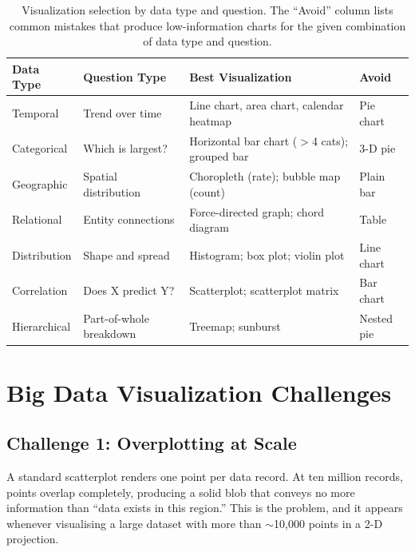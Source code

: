 \begin{table}[htbp]
\centering
\renewcommand{\arraystretch}{1.4}
\begin{tabular}{lp{3.2cm}p{4.5cm}p{2.0cm}}
  \toprule
  \textbf{Data Type} & \textbf{Question Type}
    & \textbf{Best Visualization} & \textbf{Avoid} \\
  \midrule
  Temporal    & Trend over time  & Line chart, area chart, calendar heatmap & Pie chart \\
  Categorical & Which is largest? & Horizontal bar chart ($>$4 cats); grouped bar & 3-D pie \\
  Geographic  & Spatial distribution & Choropleth (rate); bubble map (count) & Plain bar \\
  Relational  & Entity connections & Force-directed graph; chord diagram & Table \\
  Distribution & Shape and spread & Histogram; box plot; violin plot & Line chart \\
  Correlation & Does X predict Y? & Scatterplot; scatterplot matrix & Bar chart \\
  Hierarchical & Part-of-whole breakdown & Treemap; sunburst & Nested pie \\
  \bottomrule
\end{tabular}
\caption{Visualization selection by data type and question. The ``Avoid''
         column lists common mistakes that produce low-information charts
         for the given combination of data type and question.}
\label{tab:chart-selection}
\end{table}

\section{Big Data Visualization Challenges}
\label{sec:bigdata-viz-challenges}

\subsection{Challenge 1: Overplotting at Scale}
\label{subsec:overplotting}

A standard scatterplot renders one point per data record. At ten million
records, points overlap completely, producing a solid blob that conveys
no more information than ``data exists in this region.'' This is the
 problem, and it appears whenever visualising a large
dataset with more than $\sim$10{,}000 points in a 2-D projection.


